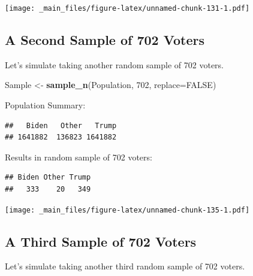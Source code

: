 \documentclass[]{book}
\newenvironment{Shaded}{\begin{snugshade}}{\end{snugshade}}
\newcommand{\KeywordTok}[1]{\textcolor[rgb]{0.13,0.29,0.53}{\textbf{#1}}}
\newcommand{\DataTypeTok}[1]{\textcolor[rgb]{0.13,0.29,0.53}{#1}}
\newcommand{\DecValTok}[1]{\textcolor[rgb]{0.00,0.00,0.81}{#1}}
\newcommand{\StringTok}[1]{\textcolor[rgb]{0.31,0.60,0.02}{#1}}
\newcommand{\OtherTok}[1]{\textcolor[rgb]{0.56,0.35,0.01}{#1}}
\newcommand{\OperatorTok}[1]{\textcolor[rgb]{0.81,0.36,0.00}{\textbf{#1}}}
\newcommand{\NormalTok}[1]{#1}
\begin{document}
\texttt{[image: \_main\_files/figure-latex/unnamed-chunk-131-1.pdf]}

\subsection{A Second Sample of 702
Voters}\label{a-second-sample-of-702-voters}

Let's simulate taking another random sample of 702 voters.

\begin{Shaded}
\begin{Highlighting}[]
\NormalTok{Sample <-}\StringTok{ }\KeywordTok{sample_n}\NormalTok{(Population, }\DecValTok{702}\NormalTok{, }\DataTypeTok{replace=}\OtherTok{FALSE}\NormalTok{)}
\end{Highlighting}
\end{Shaded}

Population Summary:

\begin{Shaded}
\end{Shaded}

\begin{verbatim}
##   Biden   Other   Trump 
## 1641882  136823 1641882
\end{verbatim}

Results in random sample of 702 voters:

\begin{Shaded}
\end{Shaded}

\begin{verbatim}
## Biden Other Trump 
##   333    20   349
\end{verbatim}

\texttt{[image: \_main\_files/figure-latex/unnamed-chunk-135-1.pdf]}

\subsection{A Third Sample of 702
Voters}\label{a-third-sample-of-702-voters}

Let's simulate taking another third random sample of 702 voters.
\end{document}
